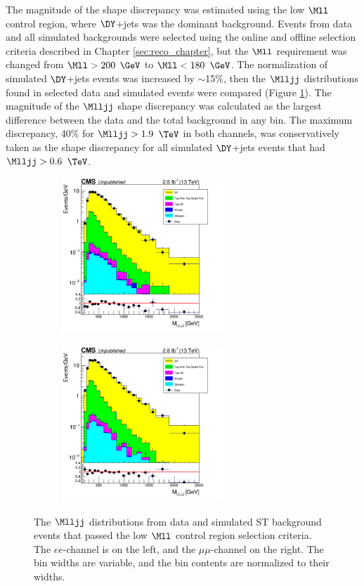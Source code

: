 The magnitude of the shape discrepancy was estimated using the low $\Mll$ control region, where $\DY$+jets was the dominant background.  
Events from data and all simulated backgrounds were selected using the online and offline selection criteria described in Chapter 
\ref{sec:reco_chapter}, but the $\Mll$ requirement was changed from $\Mll > 200$ $\GeV$ to $\Mll < 180$ $\GeV$.  The normalization of 
simulated $\DY$+jets events was increased by $\sim$15\%, then the $\Mlljj$ distributions found 
in selected data and simulated events were compared (Figure \ref{fig:mlljjLowMllCR}).  The magnitude of the $\Mlljj$ shape discrepancy was 
calculated as the largest difference between the data and the total background in any bin.  The maximum discrepancy, 40\% for 
$\Mlljj > 1.9$ $\TeV$ in both channels, was conservatively taken as the shape discrepancy for all simulated $\DY$+jets events that 
had $\Mlljj > 0.6$ $\TeV$.

\begin{figure}
	\centering
	\begin{subfigure}[t]{2.4in}
		\centering
		\includegraphics[width=2.4in]{figures/Mlljj_eeChnl_lowMllCR.png}
	\end{subfigure}
	\thickspace
	\begin{subfigure}[t]{2.4in}
		\centering
		\includegraphics[width=2.4in]{figures/Mlljj_mumuChnl_lowMllCR.png}
	\end{subfigure}
	\caption{The $\Mlljj$ distributions from data and simulated ST background events that passed the low $\Mll$ control region selection 
		criteria.  The $ee$-channel is on the left, and the $\mu\mu$-channel on the right.  The bin widths are variable, and the bin 
	contents are normalized to their widths.}
	\label{fig:mlljjLowMllCR}
\end{figure}

